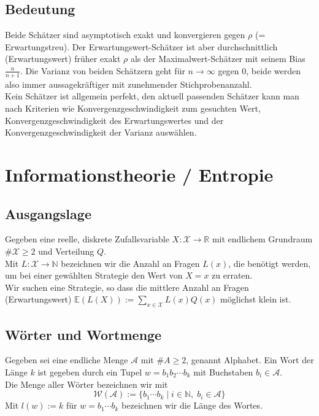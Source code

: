 \documentclass[a4paper]{article}
\begin{document}
\subsection{Bedeutung}
Beide Schätzer sind asymptotisch exakt und konvergieren gegen $\rho$ (= Erwartungstreu). Der Erwartungswert-Schätzer ist aber durchschnittlich (Erwartungswert) früher exakt $\rho$ als der Maximalwert-Schätzer mit seinem Bias $\frac{n}{n+1}$. Die Varianz von beiden Schätzern geht für $n \to \infty$ gegen 0, beide werden also immer aussagekräftiger mit zunehmender Stichprobenanzahl.\\
Kein Schätzer ist allgemein perfekt, den aktuell passenden Schätzer kann man nach Kriterien wie Konvergenzgeschwindigkeit zum gesuchten Wert, Konvergenzgeschwindigkeit des Erwartungswertes und der Konvergenzgeschwindigkeit der Varianz auswählen.

\pagebreak
\section{Informationstheorie / Entropie}

\subsection{Ausgangslage}
Gegeben eine reelle, diskrete Zufallsvariable $X :\mathcal{X} \to \mathbb{R}$ mit endlichem Grundraum $\#\mathcal{X}  \geq 2$ und Verteilung $Q$.\\
Mit $L : \mathcal{X} \to \mathbb{N}$ bezeichnen wir die Anzahl an Fragen $L(x)$, die benötigt werden, um bei einer gewählten Strategie den Wert von $X = x$ zu erraten.\\
Wir suchen eine Strategie, so dass die mittlere Anzahl an Fragen  (Erwartungswert) $\mathbb{E}(L(X)) := \sum_{x \in \mathcal{X}} L(x) Q(x)$  möglichst klein ist.

\subsection{Wörter und Wortmenge}
Gegeben sei eine endliche Menge $\mathcal{A}$ mit $\# A \geq 2$, genannt Alphabet.
Ein Wort der Länge $k$ ist gegeben durch ein Tupel $w = b_1b_2 \cdots b_k$ mit Buchstaben $b_i \in \mathcal {A}$.\\
Die Menge aller Wörter bezeichnen wir mit 
$$\mathcal{W} (\mathcal{A}) := \{  b_1 \cdots b_k \; | \; i \in \mathbb{N}, \; b_i \in \mathcal{A} \} $$
 Mit $l(w):= k$ für $w=b_1 \cdots b_k  $ bezeichnen wir die Länge des Wortes.
 
\end{document}
